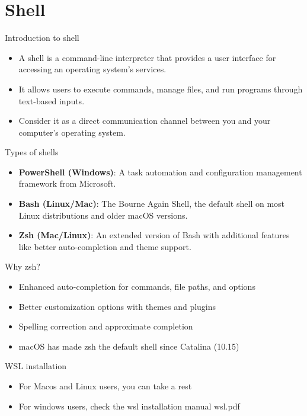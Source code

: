 \section{Shell}

\begin{frame}[fragile]{Introduction to shell}
	\begin{itemize}
		\item A shell is a command-line interpreter that provides a user interface for accessing an operating system's services.
		\item It allows users to execute commands, manage files, and run programs through text-based inputs.
		\item Consider it as a direct communication channel between you and your computer's operating system.
	\end{itemize}
\end{frame}

\begin{frame}[fragile]{Types of shells}
	\begin{itemize}
		\item \textbf{PowerShell (Windows)}: A task automation and configuration management framework from Microsoft.
		\item \textbf{Bash (Linux/Mac)}: The Bourne Again Shell, the default shell on most Linux distributions and older macOS versions.
		\item \textbf{Zsh (Mac/Linux)}: An extended version of Bash with additional features like better auto-completion and theme support.
	\end{itemize}
\end{frame}

\begin{frame}[fragile]{Why zsh?}
	\begin{itemize}
		\item Enhanced auto-completion for commands, file paths, and options
		\item Better customization options with themes and plugins
		\item Spelling correction and approximate completion
		\item macOS has made zsh the default shell since Catalina (10.15)
	\end{itemize}
\end{frame}
\begin{frame}[fragile]{WSL installation}
	\begin{itemize}
		\item For Macos and Linux users, you can take a rest
		\item For windows users, check the wsl installation manual wsl.pdf
	\end{itemize}
\end{frame}


